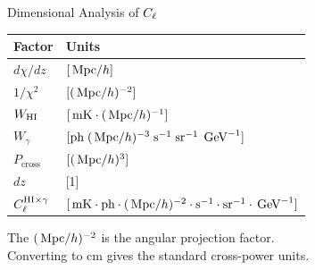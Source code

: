 \begin{frame}{Dimensional Analysis of $C_\ell$}
\begin{table}\centering\footnotesize
\begin{tabular}{ll}
\toprule
Factor & Units \\
\midrule
$d\chi/dz$ & $[\,\mathrm{Mpc}/h]$ \\
$1/\chi^2$ & $[(\,\mathrm{Mpc}/h)^{-2}]$ \\
$W_{\mathrm{HI}}$ & $[\,\mathrm{mK}\cdot(\,\mathrm{Mpc}/h)^{-1}]$ \\
$W_\gamma$ & $[\text{ph}\;(\,\mathrm{Mpc}/h)^{-3}\;\mathrm{s}^{-1}\;\mathrm{sr}^{-1}\;\,\mathrm{GeV}^{-1}]$ \\
$P_{\mathrm{cross}}$ & $[(\,\mathrm{Mpc}/h)^3]$ \\
$dz$ & [1] \\
\midrule
$C_\ell^{\mathrm{HI}\times\gamma}$ & $[\,\mathrm{mK}\cdot\text{ph}\cdot(\,\mathrm{Mpc}/h)^{-2}\cdot\mathrm{s}^{-1}\cdot\mathrm{sr}^{-1}\cdot\,\mathrm{GeV}^{-1}]$ \\
\bottomrule
\end{tabular}
\end{table}

The $({\,\mathrm{Mpc}/h})^{-2}$ is the angular projection factor.\\
Converting to cm gives the standard cross-power units.
\end{frame}
